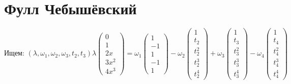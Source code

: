\documentclass[12pt,a4paper]{article}
\begin{document}
	
	\tableofcontents
	
	\newpage
	\section{Фулл Чебышёвский}
	
	\[
	\text{Ищем: } (\lambda, \omega_1, \omega_2, \omega_3, t_2, t_3)
	
	\lambda \begin{pmatrix} 0 \\ 1 \\ 2x \\ 3x^2 \\ 4x^3 \end{pmatrix} = \omega_1 \begin{pmatrix} 1 \\ -1 \\ 1 \\ -1 \\ 1 \end{pmatrix} - \omega_2 \begin{pmatrix} 1 \\ t_2 \\ t_2^2 \\ t_2^3 \\ t_2^4 \end{pmatrix} + \omega_3 \begin{pmatrix} 1 \\ t_3 \\ t_3^2 \\ t_3^3 \\ t_3^4 \end{pmatrix} - \omega_4 \begin{pmatrix} 1 \\ t_4 \\ t_4^2 \\ t_4^3 \\ t_4^4 \end{pmatrix}
	
	\]
	
\end{document}
